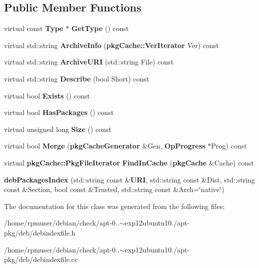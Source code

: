 \subsection*{\-Public \-Member \-Functions}
\begin{DoxyCompactItemize}
\item 
virtual const {\bf \-Type} $\ast$ {\bfseries \-Get\-Type} () const \label{classdebPackagesIndex_a97e9791ce2bb129d7b03dfe2f55de366}

\item 
virtual std\-::string {\bfseries \-Archive\-Info} ({\bf pkg\-Cache\-::\-Ver\-Iterator} \-Ver) const \label{classdebPackagesIndex_a53805b4bd2419bdd8e6ec00d3e97b56e}

\item 
virtual std\-::string {\bfseries \-Archive\-U\-R\-I} (std\-::string \-File) const \label{classdebPackagesIndex_ac797e5aad2fdbc2462e14647d924185e}

\item 
virtual std\-::string {\bfseries \-Describe} (bool \-Short) const \label{classdebPackagesIndex_a1d76db0d4174d2926a4c5af85e1019d9}

\item 
virtual bool {\bfseries \-Exists} () const \label{classdebPackagesIndex_aa746a17c5bebccb81d72dccb29948ec4}

\item 
virtual bool {\bfseries \-Has\-Packages} () const \label{classdebPackagesIndex_a3529b24d8d4f049bd120b93d56d467d0}

\item 
virtual unsigned long {\bfseries \-Size} () const \label{classdebPackagesIndex_ab1050fe2604ef4e6cba6491de8a9f708}

\item 
virtual bool {\bfseries \-Merge} ({\bf pkg\-Cache\-Generator} \&\-Gen, {\bf \-Op\-Progress} $\ast$\-Prog) const \label{classdebPackagesIndex_a7055ce0e05b5bcf6fad25971d5e3c9e4}

\item 
virtual {\bf pkg\-Cache\-::\-Pkg\-File\-Iterator} {\bfseries \-Find\-In\-Cache} ({\bf pkg\-Cache} \&\-Cache) const \label{classdebPackagesIndex_afa0e20f879d9090dac2a7a4830bc7015}

\item 
{\bfseries deb\-Packages\-Index} (std\-::string const \&{\bf \-U\-R\-I}, std\-::string const \&\-Dist, std\-::string const \&\-Section, bool const \&\-Trusted, std\-::string const \&\-Arch=\char`\"{}native\char`\"{})\label{classdebPackagesIndex_a9c3cc7b77975774604f849b84640444e}

\end{DoxyCompactItemize}


\-The documentation for this class was generated from the following files\-:\begin{DoxyCompactItemize}
\item 
/home/rpmuser/debian/check/apt-\/0..$\sim$exp12ubuntu10./apt-\/pkg/deb/debindexfile.\-h\item 
/home/rpmuser/debian/check/apt-\/0..$\sim$exp12ubuntu10./apt-\/pkg/deb/debindexfile.\-cc\end{DoxyCompactItemize}
